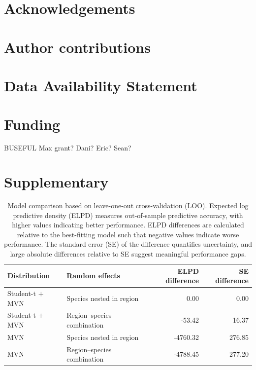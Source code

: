 \documentclass[11pt]{article}
\begin{document}
\begin{spacing}{1.5}
\section{Acknowledgements}

\section{Author contributions}

\section{Data Availability Statement}

\section{Funding}
BUSEFUL
Max grant?
Dani? Eric? Sean? 

\end{spacing}

%


\clearpage

\appendix
\section{Supplementary}


\renewcommand{\thefigure}{S\arabic{figure}}
\renewcommand{\thetable}{S\arabic{table}}
\setcounter{figure}{0}
\setcounter{table}{0}

\onehalfspacing
\linenumbers
\resetlinenumber
\setcounter{secnumdepth}{0}
\setcounter{page}{1}
\setcounter{equation}{0}
\nolinenumbers



\begin{table}[htbp]
\caption{
Model comparison based on leave-one-out cross-validation (LOO). 
Expected log predictive density (ELPD) measures out-of-sample predictive accuracy, with higher values indicating better performance. 
ELPD differences are calculated relative to the best-fitting model such that negative values indicate worse performance. 
The standard error (SE) of the difference quantifies uncertainty, and large absolute differences relative to SE suggest meaningful performance gaps.
}
\label{tab:loo}
\centering
\begin{tabular}[t]{llrr}
\toprule
Distribution & Random effects & ELPD difference & SE difference\\
\midrule
Student-t $+$ MVN & Species nested in region & 0.00 & 0.00\\
Student-t $+$ MVN & Region–species combination & -53.42 & 16.37\\
MVN & Species nested in region & -4760.32 & 276.85\\
MVN & Region–species combination & -4788.45 & 277.20\\
\bottomrule
\end{tabular}
\end{table}
\end{document}
